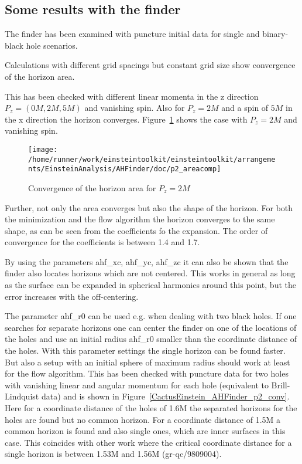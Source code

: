\subsection{Some results with the finder}
The finder has been examined with puncture initial data for single and
binary-black hole scenarios.

Calculations with different grid spacings but constant grid size show
convergence of the horizon area.

This has been checked with different linear momenta in the z direction
$P_{z}=(0M,2M,5M)$ and vanishing spin. Also for $P_{z}=2M$ and a spin of $5M$
in the x direction the horizon converges. 
Figure~\ref{CactusEistein_AHFinder_p2_conv} shows the case with
$P_{z}=2M$ and vanishing spin.

\begin{figure}[ht]
\begin{center}
\texttt{[image: /home/runner/work/einsteintoolkit/einsteintoolkit/arrangements/EinsteinAnalysis/AHFinder/doc/p2\_areacomp]}
\end{center}
\caption{Convergence of the horizon area for $P_{z}=2M$}
\label{CactusEistein_AHFinder_p2_conv}
\end{figure}

Further, not only the area converges but also the shape of the horizon.
For both the minimization and the flow algorithm the horizon converges to
the same shape, as can be seen from the coefficients fo the expansion.
The order of convergence for the coefficients is between 1.4 and 1.7.

By using the parameters ahf\_xc, ahf\_yc, ahf\_zc it can also be shown that
the finder also locates horizons which are not centered. This works in
general as long as the surface can be expanded in spherical harmonics
around this point, but the error increases with the off-centering.

The parameter ahf\_r0 can be used e.g. when dealing with two black holes.
If one searches for separate horizons one can center the finder on one of
the locations of the holes and use an initial radius ahf\_r0 smaller than
the coordinate distance of the holes. With this parameter settings the
single horizon can be found faster. But also a setup with an initial
sphere of maximum radius should work at least for the flow algorithm.
This has been checked with puncture data for two holes with vanishing
linear and angular momentum for each hole (equivalent to Brill-Lindquist
data) and is shown in Figure~\ref{CactusEinstein_AHFinder_p2_conv}. 
Here for a coordinate distance of the holes of 1.6M the separated
horizons for the holes are found but no common horizon. For a coordinate
distance of 1.5M a common horizon is found and also single ones, which
are inner surfaces in this case. This coincides with other work where the
critical coordinate distance for a single horizon is between 1.53M and
1.56M (gr-qc/9809004).

